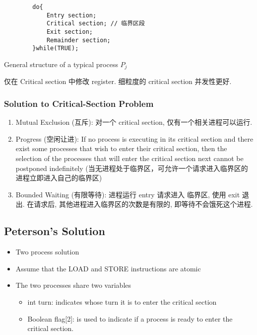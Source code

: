 \begin{code}
    \begin{verbatim}
        do{
            Entry section;
            Critical section; // 临界区段
            Exit section;
            Remainder section;
        }while(TRUE);
    \end{verbatim}
    \caption{General structure of a typical process $P_j$}
\end{code}


仅在 Critical section 中修改 register. 细粒度的 critical section 并发性更好. 

\subsubsection{Solution to Critical-Section Problem}
\begin{enumerate}
    \item Mutual Exclusion (互斥): 对一个 critical section, 仅有一个相关进程可以运行. 
    \item Progress (空闲让进): If no process is executing in its critical section and there exist some processes that wish to enter their critical section, then the selection of the processes that will enter the critical section next cannot be postponed indefinitely (当无进程处于临界区，可允许一个请求进入临界区的进程立即进入自己的临界区)
    \item Bounded Waiting (有限等待): 进程运行 entry 请求进入 临界区, 使用 exit 退出. 在请求后, 其他进程进入临界区的次数是有限的, 即等待不会饿死这个进程. 
\end{enumerate}


\subsection{Peterson's Solution}
\begin{itemize}
    \item Two process solution
    \item Assume that the LOAD and STORE instructions are atomic
    \item The two processes share two variables
    \begin{itemize}
        \item int turn: indicates whose turn it is to enter the critical section
        \item Boolean flag[2]: is used to indicate if a process is ready to enter the critical section.
    \end{itemize}
\end{itemize}

